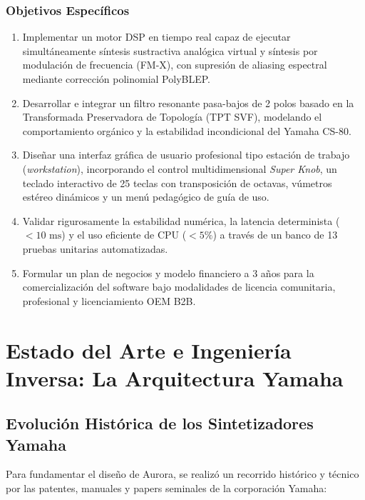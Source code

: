 \documentclass[11pt,a4paper]{article}
\begin{document}
\subsubsection{Objetivos Específicos}
\begin{enumerate}[label=\alph*)]
    \item Implementar un motor DSP en tiempo real capaz de ejecutar simultáneamente síntesis sustractiva analógica virtual y síntesis por modulación de frecuencia (FM-X), con supresión de aliasing espectral mediante corrección polinomial PolyBLEP.
    \item Desarrollar e integrar un filtro resonante pasa-bajos de 2 polos basado en la Transformada Preservadora de Topología (TPT SVF), modelando el comportamiento orgánico y la estabilidad incondicional del Yamaha CS-80.
    \item Diseñar una interfaz gráfica de usuario profesional tipo estación de trabajo (\textit{workstation}), incorporando el control multidimensional \textit{Super Knob}, un teclado interactivo de 25 teclas con transposición de octavas, vúmetros estéreo dinámicos y un menú pedagógico de guía de uso.
    \item Validar rigurosamente la estabilidad numérica, la latencia determinista ($< 10\text{ ms}$) y el uso eficiente de CPU ($< 5\%$) a través de un banco de 13 pruebas unitarias automatizadas.
    \item Formular un plan de negocios y modelo financiero a 3 años para la comercialización del software bajo modalidades de licencia comunitaria, profesional y licenciamiento OEM B2B.
\end{enumerate}

\section{Estado del Arte e Ingeniería Inversa: La Arquitectura Yamaha}

\subsection{Evolución Histórica de los Sintetizadores Yamaha}
Para fundamentar el diseño de Aurora, se realizó un recorrido histórico y técnico por las patentes, manuales y papers seminales de la corporación Yamaha:
\end{document}
